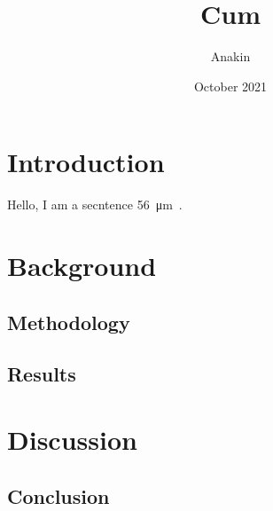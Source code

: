 \documentclass[a4paper,11pt]{report}
\title{Cum}
\author{Anakin}
\date{October 2021}
\begin{document}
\def\spath#1{}
\spath{Title} %

\tableofcontents
\newpage




\chapter{Introduction}
\spath{Intro}


Hello, I am a secntence \SI{56}{\um}~\cite{dirac}.



\newpage
\chapter{Background}
\spath{backgroudn}


\newpage
\section{Methodology}


\newpage
\section{Results}


\newpage
\chapter{Discussion}

\newpage
\section{Conclusion}


\newpage
\printbibliography[title={Bliblyogrpah}]
\end{document}
